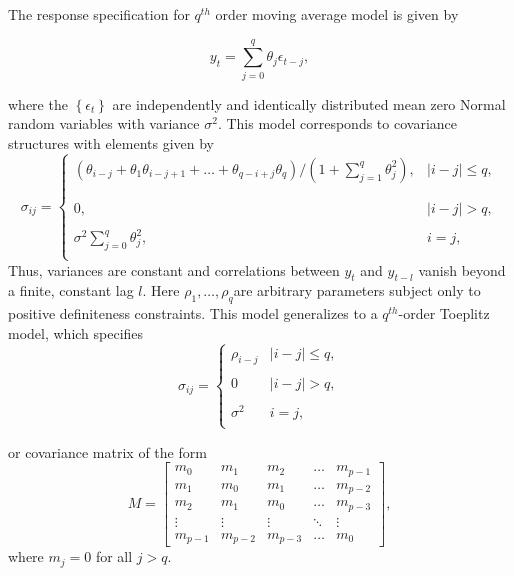 \bigskip

The response specification for $q^{th}$ order moving average model  is given by 

\begin{equation}\label{eq:ma-q-model}
y_{t} = \sum_{j = 0}^{q} \theta_j \epsilon_{t-j},
\end{equation}

\noindent
where the $\left\{\epsilon_t\right\}$ are independently and identically distributed mean zero Normal random variables with variance $\sigma^2$. This model corresponds to covariance structures with elements given by
\begin{equation*}
\sigma_{ij} = \left\{ \begin{array}{ll}
\left(\theta_{i-j} + \theta_{1}\theta_{i-j +1} + \dots + \theta_{q-i+j}\theta_{q}\right)/\left(1 + \sum_{j = 1}^q \theta_j^2\right), & \vert i-j\vert \le q,\\ 
& \\
& \\
0, &  \vert i-j\vert > q, \\
& \\
\sigma^2 \sum\limits_{j = 0}^q \theta_j^2, & i = j,\\
\end{array}\right.
\end{equation*}
\bigskip
\noindent
Thus, variances are constant and correlations between $y_t$ and $y_{t-l}$ vanish beyond a finite, constant lag $l$. Here $\rho_1,\dots, \rho_q$are arbitrary parameters subject only to positive definiteness constraints. This model generalizes to a $q^{th}$-order Toeplitz model, which specifies
\begin{equation} \label{eq:toeplitz-covariance-model}
\sigma_{ij} = \left\{ \begin{array}{ll}
\rho_{i-j} & \vert i - j \vert\le q, \\ 
&\\
0 & \vert i - j \vert >  q, \\ 
& \\
\sigma^2  & i = j,\\
\end{array}\right.
\end{equation}

\noindent
or covariance matrix of the form
\begin{equation} \label{eq:toeplitz-covariance-matrix}
M = \begin{bmatrix} m_0 & m_1 & m_2 & \dots & m_{p-1}\\ m_1 & m_0 & m_1 & \dots & m_{p-2}\\m_2 & m_1 & m_0 & \dots & m_{p-3}\\ \vdots & \vdots & \vdots & \ddots & \vdots\\  m_{p-1} & m_{p-2} & m_{p-3} & \dots & m_0 \end{bmatrix}, 
\end{equation}
\noindent
where $m_j = 0$ for all $j > q$.


